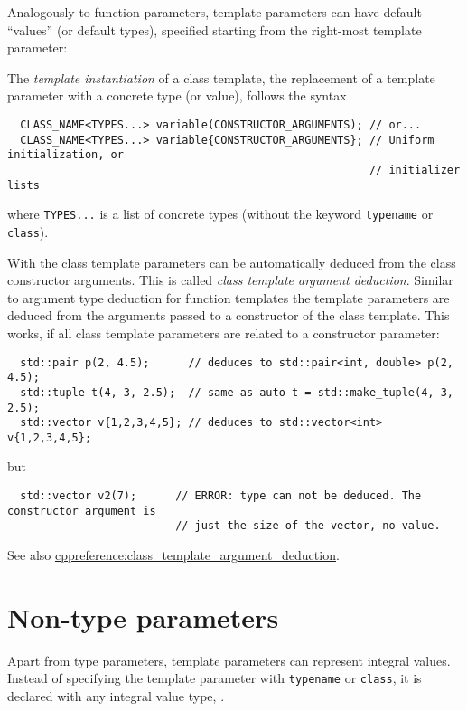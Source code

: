 \begin{rem}
  Analogously to function parameters, template parameters can have default ``values'' (or default types), specified starting from the right-most template
  parameter:
\end{rem}

The \emph{template instantiation} of a class template, \ie the replacement of a template parameter with a concrete type (or value), follows the syntax
\begin{verbatim}
  CLASS_NAME<TYPES...> variable(CONSTRUCTOR_ARGUMENTS); // or...
  CLASS_NAME<TYPES...> variable{CONSTRUCTOR_ARGUMENTS}; // Uniform initialization, or
                                                        // initializer lists
\end{verbatim}
where \texttt{TYPES...} is a list of concrete types (without the keyword \texttt{typename} or \texttt{class}).

\begin{rem}
  With \marginpar{[\cxx{17}]} the class template parameters can be automatically deduced from the class constructor arguments. This
  is called \emph{class template argument deduction}. Similar to argument type deduction for function templates the template parameters
  are deduced from the arguments passed to a constructor of the class template. This works, if all class template parameters are related to
  a constructor parameter:
  \begin{verbatim}
  std::pair p(2, 4.5);      // deduces to std::pair<int, double> p(2, 4.5);
  std::tuple t(4, 3, 2.5);  // same as auto t = std::make_tuple(4, 3, 2.5);
  std::vector v{1,2,3,4,5}; // deduces to std::vector<int> v{1,2,3,4,5};
  \end{verbatim}
  but
  \begin{verbatim}
  std::vector v2(7);      // ERROR: type can not be deduced. The constructor argument is
                          // just the size of the vector, no value.
  \end{verbatim}

  See also \href{https://en.cppreference.com/w/cpp/language/class_template_argument_deduction}{cppreference:class\_template\_argument\_deduction}.
\end{rem}



\section{Non-type parameters}\label{sec:non_type_parameters}
Apart from type parameters, template parameters can represent integral values. Instead of specifying the template parameter with \texttt{typename} or
\texttt{class}, it is declared with any integral value type, \eg {}.

